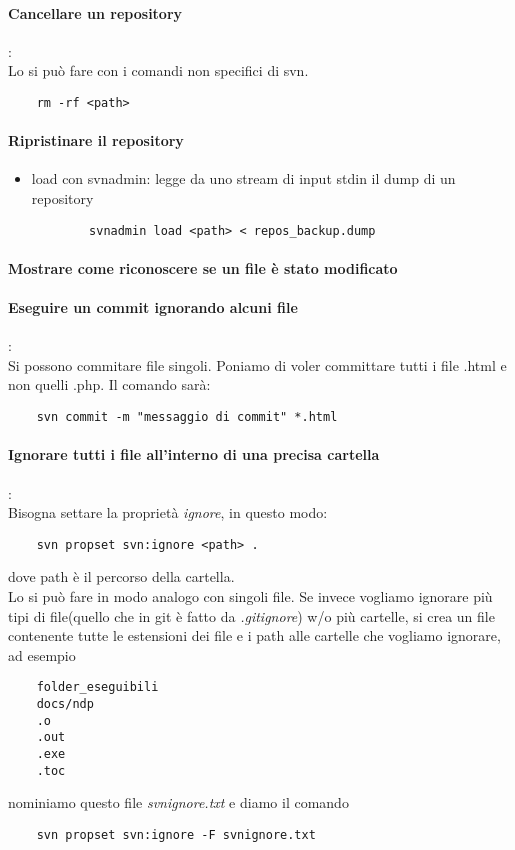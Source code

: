 \documentclass[a4paper]{article}
\begin{document}
	\paragraph{Cancellare un repository}: \\
	Lo si può fare con i comandi non specifici di svn.
	\begin{verbatim}
	rm -rf <path>
	\end{verbatim}
	
	\paragraph{Ripristinare il repository}
	\begin{itemize}
		\item load con svnadmin: legge da uno stream di input stdin il dump di un repository
		\begin{verbatim}
		svnadmin load <path> < repos_backup.dump
		\end{verbatim}
	\end{itemize}
	\paragraph{Mostrare come riconoscere se un file è stato modificato}
	
	\paragraph{Eseguire un commit ignorando alcuni file}: \\
	Si possono commitare file singoli. Poniamo di voler committare tutti i file .html e non quelli .php. Il comando sarà:
	\begin{verbatim}
	svn commit -m "messaggio di commit" *.html
	\end{verbatim}
	\paragraph{Ignorare tutti i file all'interno di una precisa cartella}: \\
	Bisogna settare la proprietà \textit{ignore}, in questo modo:
	\begin{verbatim}
	svn propset svn:ignore <path> .
	\end{verbatim}
	dove path è il percorso della cartella.\\
	Lo si può fare in modo analogo con singoli file.
	Se invece vogliamo ignorare più tipi di file(quello che in git è fatto da \textit{.gitignore}) w/o più cartelle, si crea un file contenente tutte le estensioni dei file e i path alle cartelle che vogliamo ignorare, ad esempio
	\begin{verbatim}
	folder_eseguibili
	docs/ndp
	.o 
	.out
	.exe
	.toc 
	\end{verbatim}
	nominiamo questo file \textit{svnignore.txt} e diamo il comando
	\begin{verbatim}
	svn propset svn:ignore -F svnignore.txt
	\end{verbatim}
\end{document}
